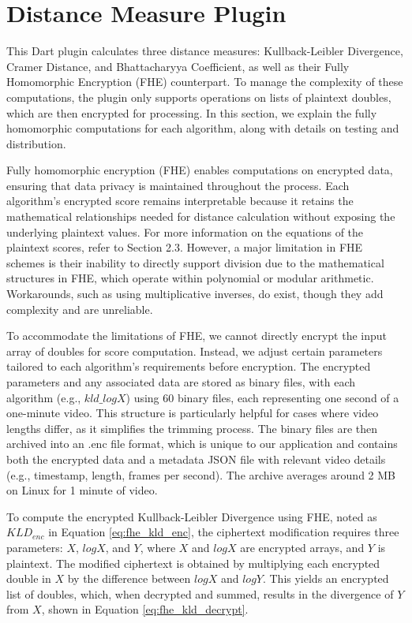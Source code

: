 \section{Distance Measure Plugin}

This Dart plugin calculates three distance measures: Kullback-Leibler Divergence, Cramer Distance, and Bhattacharyya Coefficient, as well as their Fully Homomorphic Encryption (FHE) counterpart. To manage the complexity of these computations, the plugin only supports operations on lists of plaintext doubles, which are then encrypted for processing. In this section, we explain the fully homomorphic computations for each algorithm, along with details on testing and distribution.

Fully homomorphic encryption (FHE) enables computations on encrypted data, ensuring that data privacy is maintained throughout the process. Each algorithm’s encrypted score remains interpretable because it retains the mathematical relationships needed for distance calculation without exposing the underlying plaintext values. For more information on the equations of the plaintext scores, refer to Section 2.3. However, a major limitation in FHE schemes is their inability to directly support division due to the mathematical structures in FHE, which operate within polynomial or modular arithmetic. Workarounds, such as using multiplicative inverses, do exist, though they add complexity and are unreliable.

To accommodate the limitations of FHE, we cannot directly encrypt the input array of doubles for score computation. Instead, we adjust certain parameters tailored to each algorithm’s requirements before encryption. The encrypted parameters and any associated data are stored as binary files, with each algorithm (e.g., $kld\_logX$) using 60 binary files, each representing one second of a one-minute video. This structure is particularly helpful for cases where video lengths differ, as it simplifies the trimming process. The binary files are then archived into an .enc file format, which is unique to our application and contains both the encrypted data and a metadata JSON file with relevant video details (e.g., timestamp, length, frames per second). The archive averages around 2 MB on Linux for 1 minute of video.

To compute the encrypted Kullback-Leibler Divergence using FHE, noted as $KLD_{enc}$ in Equation \ref{eq:fhe_kld_enc}, the ciphertext modification requires three parameters: $X$, $logX$, and $Y$, where $X$ and $logX$ are encrypted arrays, and $Y$ is plaintext. The modified ciphertext is obtained by multiplying each encrypted double in $X$ by the difference between $logX$ and $logY$. This yields an encrypted list of doubles, which, when decrypted and summed, results in the divergence of $Y$ from $X$, shown in Equation \ref{eq:fhe_kld_decrypt}.

